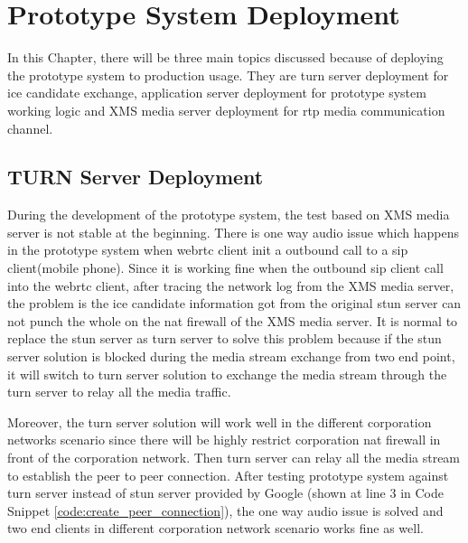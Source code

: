 \chapter{Prototype System Deployment}
\label{chp:sys_deploy}

\noindent In this Chapter, there will be three main topics discussed because of deploying the prototype system to production usage. They are \gls{turn} server deployment for \gls{ice} candidate exchange, application server deployment for prototype system working logic and XMS media server deployment for \gls{rtp} media communication channel.

\section{TURN Server Deployment}

\par During the development of the prototype system, the test based on XMS media server is not stable at the beginning. There is one way audio issue which happens in the prototype system when \gls{webrtc} client init a outbound call to a \gls{sip} client(mobile phone). Since it is working fine when the outbound \gls{sip} client call into the \gls{webrtc} client, after tracing the network log from the XMS media server, the problem is the \gls{ice} candidate information got from the original \gls{stun} server can not punch the whole on the 
\gls{nat} firewall of the XMS media server. It is normal to replace the \gls{stun} server as \gls{turn} server to solve this problem because if the \gls{stun} server solution is blocked during the media stream exchange from two end point, it will switch to \gls{turn} server solution to exchange the media stream through the \gls{turn} server to relay all the media traffic.

\par Moreover, the \gls{turn} server solution will work well in the different corporation networks scenario since there will be highly restrict corporation \gls{nat} firewall in front of the corporation network. Then \gls{turn} server can relay all the media stream to establish the peer to peer connection. After testing prototype system against \gls{turn} server instead of \gls{stun} server provided by Google (shown at line 3 in Code Snippet \ref{code:create_peer_connection}), the one way audio issue is solved and two end clients in different corporation network scenario works fine as well.

